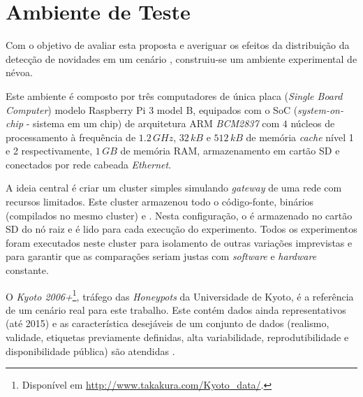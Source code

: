 
\section{Ambiente de Teste}\label{sec:ambiente}

Com o objetivo de avaliar esta proposta e averiguar os efeitos da distribuição
da detecção de novidades em um cenário \iot, construiu-se um ambiente
experimental de névoa.

Este ambiente é composto por três computadores de única placa (\emph{Single
Board Computer}) modelo Raspberry Pi 3 model B, equipados com o SoC
(\emph{system-on-chip} - sistema em um chip) de arquitetura ARM \emph{BCM2837} com
$4$ núcleos de processamento à frequência de $1.2\,GHz$, $32\,kB$ e $512\,kB$ de
memória \emph{cache} nível 1 e 2 respectivamente, $1\,GB$ de memória RAM,
armazenamento em cartão SD e conectados por rede cabeada \emph{Ethernet}.

A ideia central é criar um cluster simples simulando \emph{gateway} de uma rede
\iot com recursos limitados.
Este cluster armazenou todo o código-fonte, binários (compilados no mesmo cluster) e
\dataset.
Nesta configuração, o \dataset é armazenado no cartão SD do nó raiz e é lido para
cada execução do experimento.
Todos os experimentos foram executados neste cluster para isolamento de outras
variações imprevistas e para garantir que as comparações seriam justas com
\emph{software} e \emph{hardware} constante.


O \dataset \emph{Kyoto 2006+}\footnote{Disponível em
\url{http://www.takakura.com/Kyoto\_data/}.}, tráfego das \emph{Honeypots} da
Universidade de Kyoto, é a referência de um cenário real para este trabalho.
Este \dataset contém dados ainda representativos (até 2015) e as característica
desejáveis de um conjunto de dados (realismo, validade, etiquetas previamente
definidas, alta variabilidade, reprodutibilidade e disponibilidade pública) são
atendidas \cite{KyotoDataset,Song2011kyoto}.

